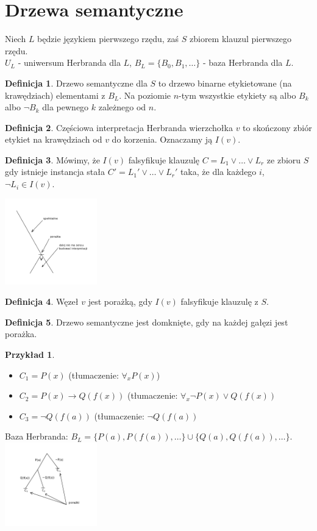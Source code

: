 \documentclass[10pt,a4paper]{article}
\theoremstyle{plain}
\theoremstyle{definition}
\newtheorem*{definition}{Definicja}
\newtheorem*{example}{Przykład}
\begin{document}
\section{Drzewa semantyczne}
Niech $L$ będzie językiem pierwszego rzędu, zaś $S$ zbiorem klauzul pierwszego rzędu.\\
$U_L$ - uniwersum Herbranda dla $L$, $B_L = \{B_0,B_1,\ldots\}$ - baza Herbranda dla $L$.
\begin{definition}
Drzewo semantyczne dla $S$ to drzewo binarne etykietowane (na krawędziach) elementami z $B_L$.
Na poziomie $n$-tym wszystkie etykiety są albo $B_k$ albo $\lnot B_k$ dla pewnego $k$ zależnego od $n$.
\end{definition}
\begin{definition}
Częściowa interpretacja Herbranda wierzchołka $v$ to skończony zbiór etykiet na krawędziach od $v$ do korzenia.
Oznaczamy ją $I(v)$.
\end{definition}
\begin{definition}
Mówimy, że $I(v)$ falsyfikuje klauzulę $C = L_1 \vee \ldots \vee L_r$ ze zbioru $S$ gdy istnieje instancja stała $C' = L_1' \vee \ldots \vee L_r'$
taka, że dla każdego $i$, $\lnot L_i \in I(v)$.
\end{definition}
\centering \includegraphics[width=0.3\textwidth]{img/drzewosemantyczne}
\begin{definition}
Węzeł $v$ jest porażką, gdy $I(v)$ falsyfikuje klauzulę z $S$.
\end{definition}
\begin{definition}
Drzewo semantyczne jest domknięte, gdy na każdej gałęzi jest porażka.
\end{definition}
\begin{example}
\begin{itemize}
Niech $S$ składa się z klauzul:
 \item $C_1 = P(x)$ (tłumaczenie: $\forall_x P(x)$)
 \item $C_2 = P(x) \to Q(f(x))$ (tłumaczenie: $\forall_x \lnot P(x) \vee Q(f(x))$
 \item $C_3 = \lnot Q(f(a))$ (tłumaczenie: $\lnot Q(f(a))$
\end{itemize}
Baza Herbranda: $B_L = \{P(a), P(f(a)), \ldots\} \cup \{Q(a), Q(f(a)), \ldots\}$.\\
\centering \includegraphics[width=0.3\textwidth]{img/drzewosemantyczne2}
\end{example}
\end{document}
